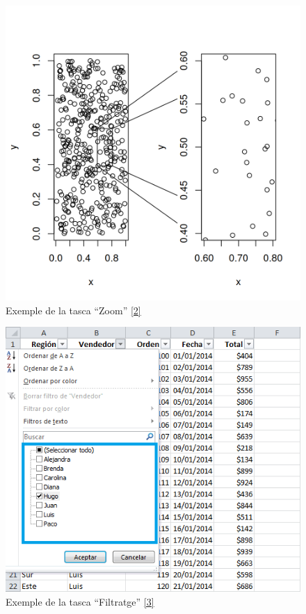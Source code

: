 \documentclass[a4paper,12pt]{report}
\begin{document}
\begin{figure}[H]
    \centering
    \includegraphics[scale = 0.8]{images/zoom.png}
    \caption{Exemple de la tasca ``Zoom'' \protect\hyperlink{ref:biblio-zoom}{[2]}}
    \label{fig:zoom}
\end{figure}
\begin{figure}
    \centering
    \includegraphics[scale = 0.7]{images/filtro.png}
    \caption{Exemple de la tasca ``Filtratge'' \protect\hyperlink{ref:biblio-filtre}{[3]}}
    \label{fig:filtratge}
\end{figure}
\end{document}
